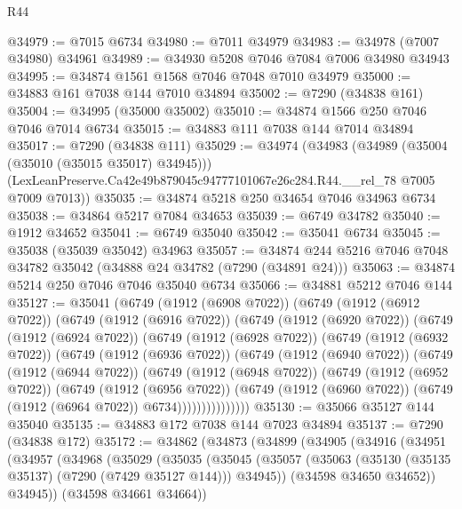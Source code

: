 \begin{lexlean}{R44}
\begin{coremodule}
{@34979 := @7015 @6734
@34980 := @7011 @34979
@34983 := @34978 (@7007 @34980) @34961
@34989 := @34930 @5208 @7046 @7084 @7006 @34980 @34943
@34995 := @34874 @1561 @1568 @7046 @7048 @7010 @34979
@35000 := @34883 @161 @7038 @144 @7010 @34894
@35002 := @7290 (@34838 @161)
@35004 := @34995 (@35000 @35002)
@35010 := @34874 @1566 @250 @7046 @7046 @7014 @6734
@35015 := @34883 @111 @7038 @144 @7014 @34894
@35017 := @7290 (@34838 @111)
@35029 := @34974
    (@34983
      (@34989 (@35004 (@35010 (@35015 @35017) @34945)))
      (LexLeanPreserve.Ca42e49b879045c94777101067e26c284.R44.__rel_78 @7005 @7009 @7013))
@35035 := @34874 @5218 @250 @34654 @7046 @34963 @6734
@35038 := @34864 @5217 @7084 @34653
@35039 := @6749 @34782
@35040 := @1912 @34652
@35041 := @6749 @35040
@35042 := @35041 @6734
@35045 := @35038 (@35039 @35042) @34963
@35057 := @34874 @244 @5216 @7046 @7048 @34782 @35042 (@34888 @24 @34782 (@7290 (@34891 @24)))
@35063 := @34874 @5214 @250 @7046 @7046 @35040 @6734
@35066 := @34881 @5212 @7046 @144
@35127 := @35041
    (@6749
      (@1912 (@6908 @7022))
      (@6749
        (@1912 (@6912 @7022))
        (@6749
          (@1912 (@6916 @7022))
          (@6749
            (@1912 (@6920 @7022))
            (@6749
              (@1912 (@6924 @7022))
              (@6749
                (@1912 (@6928 @7022))
                (@6749
                  (@1912 (@6932 @7022))
                  (@6749
                    (@1912 (@6936 @7022))
                    (@6749
                      (@1912 (@6940 @7022))
                      (@6749
                        (@1912 (@6944 @7022))
                        (@6749
                          (@1912 (@6948 @7022))
                          (@6749
                            (@1912 (@6952 @7022))
                            (@6749
                              (@1912 (@6956 @7022))
                              (@6749
                                (@1912 (@6960 @7022))
                                (@6749 (@1912 (@6964 @7022)) @6734)))))))))))))))
@35130 := @35066 @35127 @144 @35040
@35135 := @34883 @172 @7038 @144 @7023 @34894
@35137 := @7290 (@34838 @172)
@35172 := @34862
    (@34873
      (@34899
        (@34905
          (@34916
            (@34951
              (@34957
                (@34968
                  (@35029
                    (@35035
                      (@35045
                        (@35057
                          (@35063 (@35130 (@35135 @35137) (@7290 (@7429 @35127 @144))) @34945))
                        (@34598 @34650 @34652))
                      @34945))
                  (@34598 @34661 @34664))
}
\end{coremodule}
\end{lexlean}
